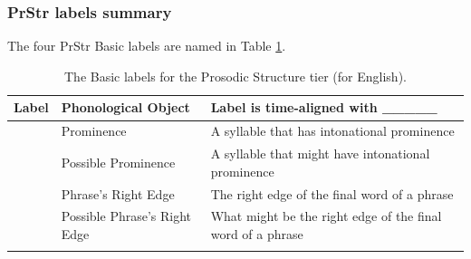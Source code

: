 \documentclass[11pt, twoside]{memoir}
\def\textlabel#1{{\relsize{-.5}\fontspec[Mapping=tex-text]{Roboto Mono}{#1}}}
\begin{document}
\subsubsection{PrStr labels summary}\label{sec:prstr-labels-summary}
The four PrStr Basic labels are named in Table \ref{PrStr basic labels}.
\begin{longtable}{clp{.525\linewidth}} \toprule \textbf{Label} & \textbf{Phonological Object} & \textbf{Label is time-aligned with \_\_\_\_\_}\tabularnewline
\midrule \endhead
\textlabel{*} & Prominence & A syllable that has intonational prominence \tabularnewline
\textlabel{?*} & Possible Prominence & A syllable that might have intonational prominence \tabularnewline
\textlabel{]} & Phrase’s Right Edge & The right edge of the final word of a phrase \tabularnewline
\textlabel{?]} & Possible Phrase’s Right Edge & What might be the right edge of the final word of a phrase \tabularnewline
\bottomrule 
\caption{The Basic labels for the Prosodic Structure tier (for English).
\label{PrStr basic labels}
}
\end{longtable}
\end{document}
